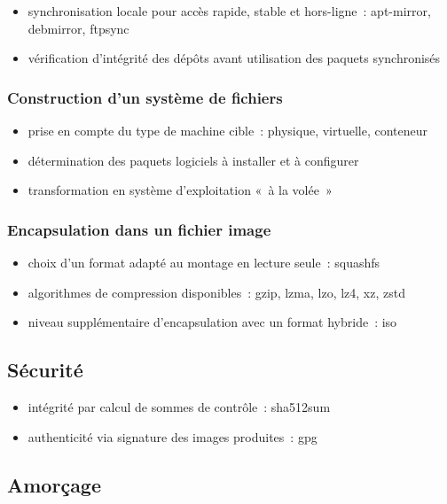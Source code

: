\documentclass[10pt]{article}
\newenvironment{itmz}{\begin{itemize}
\setlength{\itemsep}{0em}
}{\end{itemize}}
\begin{document}
\begin{itmz}
\item{synchronisation locale pour accès rapide, stable et hors-ligne : apt-mirror, debmirror, ftpsync}
\item{vérification d’intégrité des dépôts avant utilisation des paquets synchronisés}
\end{itmz}

\subsubsection{Construction d’un système de fichiers}

\begin{itmz}
\item{prise en compte du type de machine cible : physique, virtuelle, conteneur}
\item{détermination des paquets logiciels à installer et à configurer}
\item{transformation en système d’exploitation « à la volée »}
\end{itmz}

\subsubsection{Encapsulation dans un fichier image}

\begin{itmz}
\item{choix d’un format adapté au montage en lecture seule : squashfs}
\item{algorithmes de compression disponibles : gzip, lzma, lzo, lz4, xz, zstd}
\item{niveau supplémentaire d’encapsulation avec un format hybride : iso}
\end{itmz}

\subsection{Sécurité}

\begin{itmz}
\item{intégrité par calcul de sommes de contrôle : sha512sum}
\item{authenticité via signature des images produites : gpg}
\end{itmz}

\subsection{Amorçage}
\end{document}
